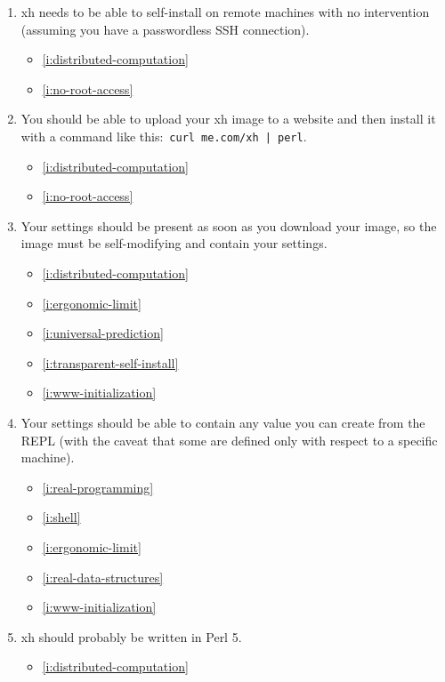 \documentclass{report}
\makeatletter
\newcommand*{\Label}[2]{%
  \@bsphack
  \begingroup
    \label{#1-original}%
    \def\@currentlabel{#2 [\ref{#1-original}]}%
    \label{#1}%
  \endgroup
  \@esphack
}
\makeatother
\begin{document}
\begin{enumerate}
\item{}\Label{i:transparent-self-install}{selfinstall}
  xh needs to be able to self-install on remote machines with no
  intervention (assuming you have a passwordless SSH connection).
\begin{itemize}
\item \ref{i:distributed-computation}
\item \ref{i:no-root-access}
\end{itemize}
\item{}\Label{i:www-initialization}{wwwinit}
  You should be able to upload your xh image to a website and then install
  it with a command like this:~\verb+curl me.com/xh | perl+.
\begin{itemize}
\item \ref{i:distributed-computation}
\item \ref{i:no-root-access}
\end{itemize}
\item{}\Label{i:self-modifying-image}{selfmodifying}
  Your settings should be present as soon as you download your image, so
  the image must be self-modifying and contain your settings.
\begin{itemize}
\item \ref{i:distributed-computation}
\item \ref{i:ergonomic-limit}
\item \ref{i:universal-prediction}
\item \ref{i:transparent-self-install}
\item \ref{i:www-initialization}
\end{itemize}
\item{}\Label{i:settings-contain-variable-definitions}{varsinrc}
  Your settings should be able to contain any value you can create from the
  REPL (with the caveat that some are defined only with respect to a
  specific machine).
\begin{itemize}
\item \ref{i:real-programming}
\item \ref{i:shell}
\item \ref{i:ergonomic-limit}
\item \ref{i:real-data-structures}
\item \ref{i:www-initialization}
\end{itemize}
\item{}\Label{i:written-in-perl}{inperl}
  xh should probably be written in Perl 5.
\begin{itemize}
\item \ref{i:distributed-computation}

\end{itemize}
\end{enumerate}
\end{document}
